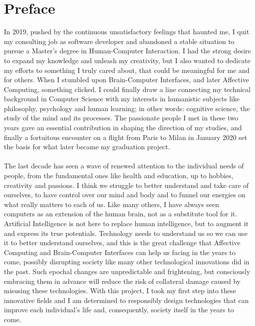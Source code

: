 \chapter{Preface }
\pagestyle{headings}

In 2019, pushed by the continuous unsatisfactory feelings that haunted me, I quit my consulting job as software developer and abandoned a stable situation to pursue a Master's degree in Human-Computer Interaction. I had the strong desire to expand my knowledge and unleash my creativity, but I also wanted to dedicate my efforts to something I truly cared about, that could be meaningful for me and for others. When I stumbled upon Brain-Computer Interfaces, and later Affective Computing, something clicked. I could finally draw a line connecting my technical background in Computer Science with my interests in humanistic subjects like philosophy, psychology and human learning; in other words: cognitive science, the study of the mind and its processes. The passionate people I met in these two years gave an essential contribution in shaping the direction of my studies, and finally a fortuitous encounter on a flight from Paris to Milan in January 2020 set the basis for what later became my graduation project. 
\\
\\
The last decade has seen a wave of renewed attention to the individual needs of people, from the fundamental ones like health and education, up to hobbies, creativity and passions. I think we struggle to better understand and take care of ourselves, to have control over our mind and body and to funnel our energies on what really matters to each of us. Like many others, I have always seen computers as an extension of the human brain, not as a substitute tool for it. Artificial Intelligence is not here to replace human intelligence, but to augment it and express its true potentials. Technology needs to understand us so we can use it to better understand ourselves, and this is the great challenge that Affective Computing and Brain-Computer Interfaces can help us facing in the years to come, possibly disrupting society like many other technological innovations did in the past. Such epochal changes are unpredictable and frightening, but consciously embracing them in advance will reduce the risk of collateral damage caused by misusing these technologies. With this project, I took my first step into these innovative fields and I am determined to responsibly design technologies that can improve each individual's life and, consequently, society itself in the years to come.
